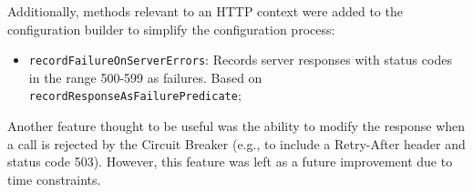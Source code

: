Additionally, methods relevant to an HTTP context were added to the configuration builder to simplify the configuration process:

\begin{itemize}
    \item \texttt{recordFailureOnServerErrors}:
    Records server responses with status codes in the range 500-599 as failures.
    Based on \texttt{recordResponseAsFailurePredicate};
\end{itemize}

Another feature thought to be useful was the ability
to modify the response when a call is rejected by the Circuit Breaker
(e.g., to include a Retry-After header and status code 503).
However, this feature was left as a future improvement due to time constraints.
